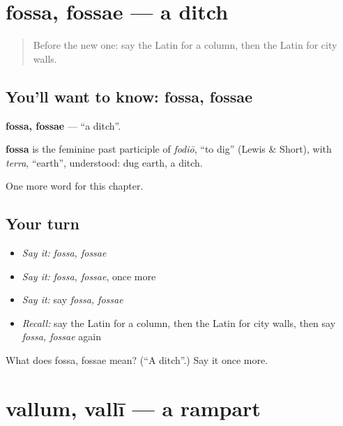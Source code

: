 \section[fossa, fossae]{fossa, fossae — a ditch}

\label{lesson:LA-C280-fossa}



\begin{quote}
Before the new one: say the Latin for a column, then the Latin for city walls.
\end{quote}

\subsection*{You'll want to know: fossa, fossae}
\textbf{fossa, fossae} — \textquotedblleft{}a ditch\textquotedblright{}.

\begin{cousinweb}
\textbf{fossa} is the feminine past participle of \emph{fodiō}, \textquotedblleft{}to dig\textquotedblright{} (Lewis \& Short), with \emph{terra}, \textquotedblleft{}earth\textquotedblright{}, understood: dug earth, a ditch.
\end{cousinweb}

\begin{grammarlens}[title={What you've built}]
One more word for this chapter.
\end{grammarlens}

\subsection*{Your turn}
\begin{itemize}
\raggedright
  \item \emph{Say it:} \emph{fossa, fossae}
  \item \emph{Say it:} \emph{fossa, fossae}, once more
  \item \emph{Say it:} say \emph{fossa, fossae}
  \item \emph{Recall:} say the Latin for a column, then the Latin for city walls, then say \emph{fossa, fossae} again
\end{itemize}

\begin{tcolorbox}[breakable,colback=teal!4,colframe=teal!35!black,title={Before you move on}]
What does fossa, fossae mean? (\textquotedblleft{}A ditch\textquotedblright{}.) Say it once more.
\end{tcolorbox}
\section[vallum, vallī]{vallum, vallī — a rampart}

